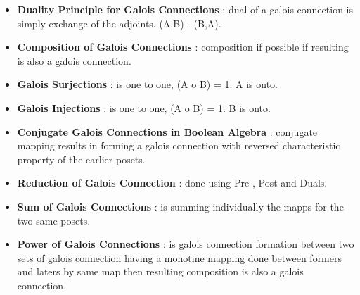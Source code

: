 \begin{itemize}
{	}

	\item{\textbf{Duality Principle for Galois Connections} : dual of a galois connection is simply exchange of the adjoints. (A,B) - (B,A).
	}

	\item{\textbf{Composition of Galois Connections} : composition if possible if resulting is also a galois connection.
	}

	\item{\textbf{Galois Surjections} : is one to one, (A o B) = 1. A is onto.
	}

	\item{\textbf{Galois Injections} : is one to one, (A o B) = 1. B is onto.
	}

	\item{\textbf{Conjugate Galois Connections in Boolean Algebra } : 
	conjugate mapping results in forming a galois connection with reversed characteristic property of the earlier posets.
	}

	\item{\textbf{Reduction of Galois Connection} :
	done using Pre , Post and Duals.
	}

	\item{\textbf{Sum of Galois Connections} : is summing individually the mapps for the two same posets.
	}

	\item{\textbf{Power of Galois Connections} : is galois connection formation between two sets of galois connection having a monotine mapping done between formers and laters by same map then resulting composition is also a galois connection.
	}

\end{itemize}

